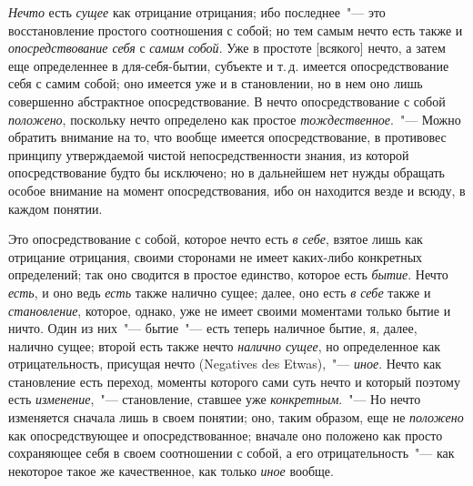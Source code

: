 \emph{Нечто} есть \emph{сущее} как отрицание отрицания; ибо последнее~"---
это восстановление простого соотношения с собой;
но тем самым нечто есть также и \emph{опосредствование
себя} с \emph{самим собой}. Уже в простоте [всякого] нечто, а
затем еще определеннее в для-себя-бытии, субъекте
и т.\,д. имеется опосредствование себя с самим собой; оно
имеется уже и в становлении, но в нем оно лишь совершенно
абстрактное опосредствование. В нечто опосредствование
с собой \emph{положено}, поскольку нечто определено
как простое \emph{тождественное}.~"--- Можно обратить внимание
на то, что вообще имеется опосредствование, в противовес
принципу утверждаемой чистой непосредственности
знания, из которой опосредствование будто бы исключено;
но в дальнейшем нет нужды обращать особое внимание
на момент опосредствования, ибо он находится везде
и всюду, в каждом понятии.

Это опосредствование с собой, которое нечто есть \emph{в
себе}, взятое лишь как отрицание отрицания, своими сторонами
не имеет каких-либо конкретных определений;
так оно сводится в простое единство, которое есть \emph{бытие}.
Нечто \emph{есть}, и оно ведь \emph{есть} также налично сущее; далее,
оно есть \emph{в себе} также и \emph{становление}, которое, однако,
уже не имеет своими моментами только бытие и ничто.
Один из них~"--- бытие~"--- есть теперь наличное бытие, я,
далее, налично сущее; второй есть также нечто \emph{налично
сущее}, но определенное как отрицательность, присущая
нечто (Negatives des Etwas),~"--- \emph{иное}. Нечто как становление
есть переход, моменты которого сами суть нечто и
который поэтому есть \emph{изменение},~"--- становление, ставшее
уже \emph{конкретным}.~"--- Но нечто изменяется сначала лишь
в своем понятии; оно, таким образом, еще не \emph{положено}
как опосредствующее и опосредствованное; вначале оно
положено как просто сохраняющее себя в своем соотношении
с собой, а его отрицательность~"--- как некоторое
такое же качественное, как только \emph{иное} вообще.


